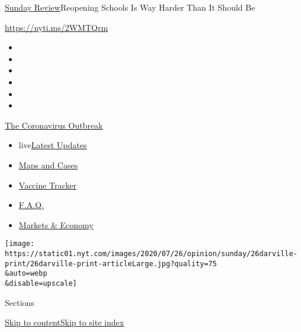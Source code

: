 \href{/section/opinion/sunday}{Sunday Review}\textbar{}Reopening Schools
Is Way Harder Than It Should Be

\href{https://nyti.ms/2WMTQrm}{https://nyti.ms/2WMTQrm}

\begin{itemize}
\item
\item
\item
\item
\item
\item
\end{itemize}

\href{https://www.nytimes.com/news-event/coronavirus?action=click\&pgtype=Article\&state=default\&region=TOP_BANNER\&context=storylines_menu}{The
Coronavirus Outbreak}

\begin{itemize}
\tightlist
\item
  live\href{https://www.nytimes.com/2020/08/08/world/coronavirus-updates.html?action=click\&pgtype=Article\&state=default\&region=TOP_BANNER\&context=storylines_menu}{Latest
  Updates}
\item
  \href{https://www.nytimes.com/interactive/2020/us/coronavirus-us-cases.html?action=click\&pgtype=Article\&state=default\&region=TOP_BANNER\&context=storylines_menu}{Maps
  and Cases}
\item
  \href{https://www.nytimes.com/interactive/2020/science/coronavirus-vaccine-tracker.html?action=click\&pgtype=Article\&state=default\&region=TOP_BANNER\&context=storylines_menu}{Vaccine
  Tracker}
\item
  \href{https://www.nytimes.com/interactive/2020/world/coronavirus-tips-advice.html?action=click\&pgtype=Article\&state=default\&region=TOP_BANNER\&context=storylines_menu}{F.A.Q.}
\item
  \href{https://www.nytimes.com/live/2020/08/07/business/stock-market-today-coronavirus?action=click\&pgtype=Article\&state=default\&region=TOP_BANNER\&context=storylines_menu}{Markets
  \& Economy}
\end{itemize}

\texttt{[image: https://static01.nyt.com/images/2020/07/26/opinion/sunday/26darville-print/26darville-print-articleLarge.jpg?quality=75\\\&auto=webp\\\&disable=upscale]}

Sections

\protect\hyperlink{site-content}{Skip to
content}\protect\hyperlink{site-index}{Skip to site index}

